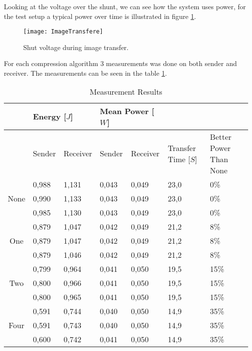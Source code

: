 Looking at the voltage over the shunt, we can see how the system uses power, for the test setup a typical power over time is illustrated in figure \ref{fig:ImageTransfere}.
\begin{figure}[H]
	\centering
	\texttt{[image: ImageTransfere]}
	\caption{ Shut voltage during image transfer. }
	\label{fig:ImageTransfere}
\end{figure}
For each compression algorithm 3 measurements was done on both sender and receiver. 
The measurements can be seen in the table \ref{tab:MeasurementResults}.
\begin{table}[H]
	\begin{tabular}{cllllll}

	\cline{2-5} 
	\multicolumn{1}{l}{} 	& \multicolumn{2}{l}{Energy {[$J$]}} & \multicolumn{2}{l}{Mean Power [$W$]} &	&	\\ \hline
	\rowcolor{gr}
	\multicolumn{1}{l}{Bit Removed}	& Sender	& Receiver	& Sender	& Receiver	& \multicolumn{1}{l}{Transfer Time [$S$]} & \multicolumn{1}{l}{Better Power Than None} \\ \hline
	\multicolumn{1}{c}{\multirow{3}{*}{None}} & 0,988	& 1,131	& 0,043	& 0,049	& \multicolumn{1}{l}{23,0}	& \multicolumn{1}{l}{0\%}	\\  
	\multicolumn{1}{c}{}	& 0,990	& 1,133	& 0,043	& 0,049	& \multicolumn{1}{l}{23,0}	& \multicolumn{1}{l}{0\%}	\\ 
	\multicolumn{1}{c}{}	& 0,985	& 1,130	& 0,043	& 0,049	& \multicolumn{1}{l}{23,0}	& \multicolumn{1}{l}{0\%}	\\ \hline
	\multicolumn{1}{c}{\multirow{3}{*}{One}}  & 0,879	& 1,047	& 0,042	& 0,049	& \multicolumn{1}{l}{21,2}	& \multicolumn{1}{l}{8\%}	\\ %
	\multicolumn{1}{c}{}	& 0,879	& 1,047	& 0,042	& 0,049	& \multicolumn{1}{l}{21,2}	& \multicolumn{1}{l}{8\%}	\\ %
	\multicolumn{1}{c}{}	& 0,879	& 1,046	& 0,042	& 0,049	& \multicolumn{1}{l}{21,2}	& \multicolumn{1}{l}{8\%}	\\ \hline
	\multicolumn{1}{c}{\multirow{3}{*}{Two}}  & 0,799	& 0,964	& 0,041	& 0,050	& \multicolumn{1}{l}{19,5}	& \multicolumn{1}{l}{15\%}	\\ %
	\multicolumn{1}{c}{}	& 0,800	& 0,966	& 0,041	& 0,050	& \multicolumn{1}{l}{19,5}	& \multicolumn{1}{l}{15\%}	\\ %
	\multicolumn{1}{c}{}	& 0,800	& 0,965	& 0,041	& 0,050	& \multicolumn{1}{l}{19,5}	& \multicolumn{1}{l}{15\%}	\\ \hline
	\multicolumn{1}{c}{\multirow{3}{*}{Four}} & 0,591	& 0,744	& 0,040	& 0,050	& \multicolumn{1}{l}{14,9}	& \multicolumn{1}{l}{35\%}	\\ %
	\multicolumn{1}{c}{}	& 0,591 & 0,743	& 0,040	& 0,050	& \multicolumn{1}{l}{14,9}	& \multicolumn{1}{l}{35\%}	\\ %
	\multicolumn{1}{c}{}	& 0,600 & 0,742	& 0,041	& 0,050	& \multicolumn{1}{l}{14,9}	& \multicolumn{1}{l}{35\%}	\\ \hline
	\end{tabular}

	\caption{Measurement Results }
	\label{tab:MeasurementResults}
\end{table}
